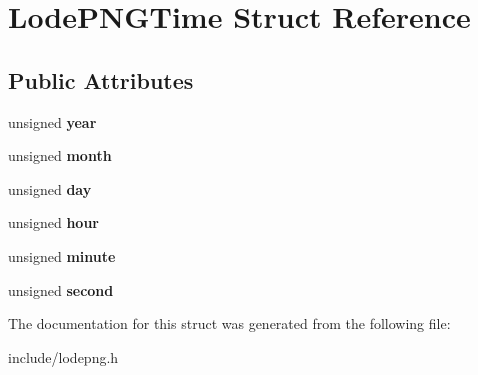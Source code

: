 \hypertarget{struct_lode_p_n_g_time}{}\section{Lode\+P\+N\+G\+Time Struct Reference}
\label{struct_lode_p_n_g_time}
\subsection*{Public Attributes}
\begin{DoxyCompactItemize}
\item 
unsigned {\bfseries year}\hypertarget{struct_lode_p_n_g_time_a32b68342f39f3d38ba91a721b1149b8f}{}\label{struct_lode_p_n_g_time_a32b68342f39f3d38ba91a721b1149b8f}

\item 
unsigned {\bfseries month}\hypertarget{struct_lode_p_n_g_time_a295d890e862d5cd0c444e9d3a96fa9d5}{}\label{struct_lode_p_n_g_time_a295d890e862d5cd0c444e9d3a96fa9d5}

\item 
unsigned {\bfseries day}\hypertarget{struct_lode_p_n_g_time_aa3dee3b7b3a1e730fbded7a7b8cf355e}{}\label{struct_lode_p_n_g_time_aa3dee3b7b3a1e730fbded7a7b8cf355e}

\item 
unsigned {\bfseries hour}\hypertarget{struct_lode_p_n_g_time_ac99cb7f3ce16a85f9f505b7f5f6e0aa7}{}\label{struct_lode_p_n_g_time_ac99cb7f3ce16a85f9f505b7f5f6e0aa7}

\item 
unsigned {\bfseries minute}\hypertarget{struct_lode_p_n_g_time_ac3045de79728f29fc61f534b062e0f13}{}\label{struct_lode_p_n_g_time_ac3045de79728f29fc61f534b062e0f13}

\item 
unsigned {\bfseries second}\hypertarget{struct_lode_p_n_g_time_a6c691c5821e828488a8bb8a90751a2f0}{}\label{struct_lode_p_n_g_time_a6c691c5821e828488a8bb8a90751a2f0}

\end{DoxyCompactItemize}


The documentation for this struct was generated from the following file\+:\begin{DoxyCompactItemize}
\item 
include/lodepng.\+h\end{DoxyCompactItemize}

